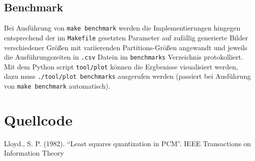 \documentclass[
    bibliography=totoc, cd=lightcolor, cdmath=false, ngerman]{tudscrreprt}
\begin{document}
\section{Benchmark}

Bei Ausführung von \texttt{make benchmark} werden die Implementierungen
hingegen entsprechend der im \texttt{Makefile} gesetzten Parameter auf zufällig
generierte Bilder verschiedener Größen mit variierenden Partitions-Größen
angewandt und jeweils die Ausführungszeiten in \texttt{.csv} Datein im
\texttt{benchmarks} Verzeichnis protokolliert. Mit dem Python script
\texttt{tool/plot} können die Ergbenisse visualisiert werden, dazu muss
\texttt{./tool/plot benchmarks} ausgerufen werden (passiert bei Ausführung von
\texttt{make benchmark} automatisch).

\chapter{Quellcode}

\begin{thebibliography}{1}
Lloyd., S. P. (1982). ``Least squares quantization in PCM''. IEEE Transactions
on Information Theory
\end{thebibliography}
\end{document}
